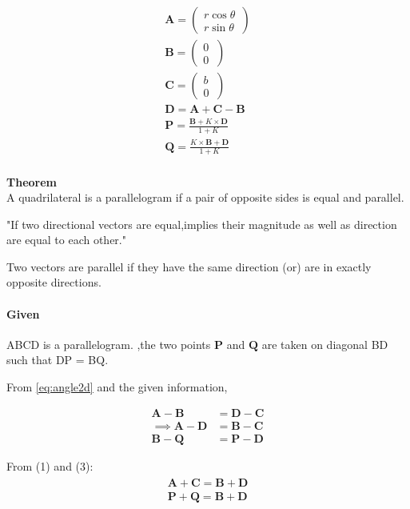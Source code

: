 \documentclass[10pt, a4paper]{article}
\let\vec\mathbf
\begin{document}
\begin{align*}
\vec{A}=\begin{pmatrix} r\cos\theta\\ r\sin\theta\ \end{pmatrix} \\
\vec{B}=\begin{pmatrix} 0\\ 0\ \end{pmatrix} \\
\vec{C}=\begin{pmatrix} b\\ 0\ \end{pmatrix} \\
\vec{D}={\vec{A}+\vec{C}-\vec{B}} \\
\vec{P} =  \frac{\vec{B} +K\times \vec{D}}{1+K} \\
\vec{Q} =  \frac{K\times\vec{B} +\vec{D}}{1+K} \\ 
\end{align*}


\textbf{Theorem}\\
A quadrilateral is a parallelogram if a pair of opposite sides
is equal and parallel.

"If two directional vectors are equal,implies their magnitude as well as direction are equal to each other."

Two vectors are parallel if they have the same direction (or) are in exactly opposite directions.

\paragraph{Given} ABCD is a parallelogram.
 ,the two points $\vec{P}$ and $\vec{Q}$ are taken on diagonal BD such that DP = BQ.

\fi
From 
    \eqref{eq:angle2d} and the given information,

\begin{align}
	\vec{A}-\vec{B} &=\vec{D}-\vec{C} \\
	\implies    \vec{A}-\vec{D} &=\vec{B}-\vec{C}\\
	\vec{B}-\vec{Q} &=\vec{P}-\vec{D}
\end{align}

From (1) and (3):
\begin{align}
\begin{split}
    \vec{A}+\vec{C} =\vec{B}+\vec{D}\\
    \vec{P}+\vec{Q} =\vec{B}+\vec{D}
\end{split}
\end{align}
\end{document}
